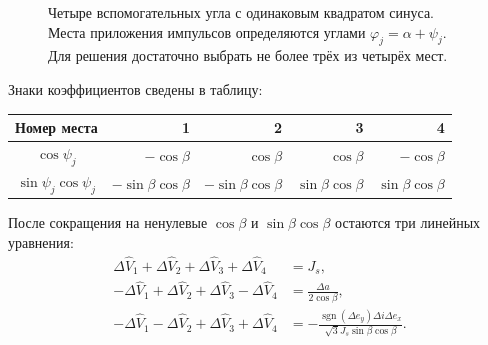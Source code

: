 \begin{figure}[htbp]
\centering
{}
\caption{Четыре вспомогательных угла с одинаковым квадратом синуса.
Места приложения импульсов определяются углами $\varphi_j=\alpha+\psi_j$.
Для решения достаточно выбрать не более трёх из четырёх мест.}
\label{fig:sc-four-angles}
\end{figure}

Знаки коэффициентов сведены в таблицу:
\begin{center}
\begin{tabular}{c|rrrr}
 Номер места &1&2&3&4\\\hline
 $\cos\psi_j$ & $-\cos\beta$ & $\cos\beta$ & $\cos\beta$ & $-\cos\beta$\\
 $\sin\psi_j\cos\psi_j$ & $-\sin\beta\cos\beta$ & $-\sin\beta\cos\beta$
                          & $\sin\beta\cos\beta$ & $\sin\beta\cos\beta$
\end{tabular}
\end{center}
После сокращения на ненулевые $\cos\beta$ и
$\sin\beta\cos\beta$ остаются три линейных уравнения:
\begin{equation}
\begin{aligned}
 \Delta\widehat V_1+\Delta\widehat V_2+\Delta\widehat V_3+\Delta\widehat V_4&=J_s,\\
 -\Delta\widehat V_1+\Delta\widehat V_2+\Delta\widehat V_3-\Delta\widehat V_4
       &=\frac{\Delta a}{2\cos\beta},\\
 -\Delta\widehat V_1-\Delta\widehat V_2+\Delta\widehat V_3+\Delta\widehat V_4
       &=-\frac{\operatorname{sgn}(\Delta e_y)\Delta i\Delta e_x}
                    {\sqrt3J_s\sin\beta\cos\beta}.
\end{aligned}
\label{eq:sc-linear-system}
\end{equation}

